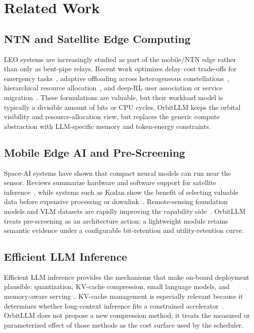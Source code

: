 \section{Related Work}
\label{sec:related}

\subsection{NTN and Satellite Edge Computing}
LEO systems are increasingly studied as part of the mobile/NTN edge rather than only as bent-pipe relays. Recent work optimizes delay--cost trade-offs for emergency tasks~\cite{li2025delaycost}, adaptive offloading across heterogeneous constellations~\cite{zhao2025region}, hierarchical resource allocation~\cite{gao2024hierarchical}, and deep-RL user association or service migration~\cite{zhang2024dynamic,wu2024task}. These formulations are valuable, but their workload model is typically a divisible amount of bits or CPU cycles. OrbitLLM keeps the orbital visibility and resource-allocation view, but replaces the generic compute abstraction with LLM-specific memory and token-energy constraints.

\subsection{Mobile Edge AI and Pre-Screening}
Space-AI systems have shown that compact neural models can run near the sensor. Reviews summarize hardware and software support for satellite inference~\cite{diana2024review,lonard2026fpgaenabled}, while systems such as Kodan show the benefit of selecting valuable data before expensive processing or downlink~\cite{denby2023kodan}. Remote-sensing foundation models and VLM datasets are rapidly improving the capability side~\cite{huo2025when,weng2025visionlanguage,wang2024skyscript}. OrbitLLM treats pre-screening as an architecture action: a lightweight module retains semantic evidence under a configurable bit-retention and utility-retention curve.

\subsection{Efficient LLM Inference}
Efficient LLM inference provides the mechanisms that make on-board deployment plausible: quantization, KV-cache compression, small language models, and memory-aware serving~\cite{zhou2024survey,bai2024beyond,wang2024comprehensive}. KV-cache management is especially relevant because it determines whether long-context inference fits a constrained accelerator~\cite{li2024survey,kim2025oaken,alizadeh2024flash}. OrbitLLM does not propose a new compression method; it treats the measured or parameterized effect of those methods as the cost surface used by the scheduler.
